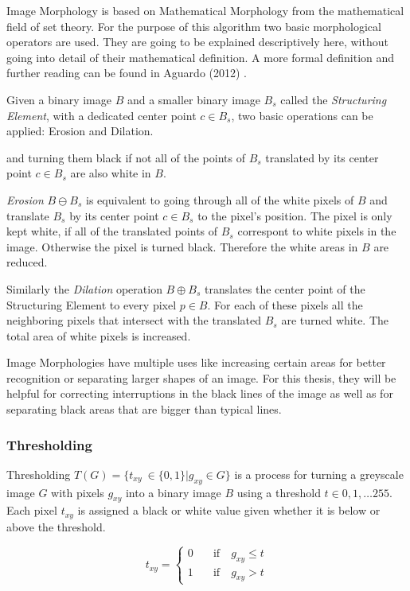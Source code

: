 \documentclass[serif,article,noparskip]{agse-thesis}
\begin{document}
Image Morphology is based on Mathematical Morphology from the mathematical field
of set theory. For the purpose of this algorithm two basic morphological
operators are used. They are going to be explained descriptively here, without
going into detail of their mathematical definition. A more formal definition and
further reading can be found in Aguardo (2012) \cite{Aguardo2012}.

Given a binary image $B$ and a smaller binary image $B_s$ called the
\textit{Structuring Element}, with a dedicated center point $c \in B_s$, two
basic operations can be applied: Erosion and Dilation.

and turning them black if not all of the points of $B_s$
translated by its center point $c \in B_s$ are also white in $B$.

\textit{Erosion} $B \ominus B_s$ is equivalent to going through all of the white
pixels of $B$ and translate $B_s$ by its center point $c \in B_s$ to the pixel's
position. The pixel is only kept white, if all of the translated points of $B_s$
correspont to white pixels in the image. Otherwise the pixel is turned black. Therefore
the white areas in $B$ are reduced. \cite{Smith1997}

Similarly the \textit{Dilation} operation  $B \oplus B_s$ translates the center
point of the Structuring Element to every pixel $p \in B$. For each of these
pixels all the neighboring pixels that intersect with the translated $B_s$ are
turned white. The total area of white pixels is increased. \cite{Smith1997}

Image Morphologies have multiple uses like increasing certain areas for better
recognition or separating larger shapes of an image. For this thesis, they will
be helpful for correcting interruptions in the black lines of the image as well
as for separating black areas that are bigger than typical lines.

\subsubsection{Thresholding}

Thresholding $T(G) = \{t_{xy}\ \in \{0,1\} | g_{xy} \in G\}$ is a process for turning a greyscale image $G$
with pixels $g_{xy}$ into a binary image $B$ using a threshold $t \in
0,1,\dots255$. Each pixel $t_{xy}$ is assigned a black or white value given
whether it is below or above the threshold.

\begin{equation}
  t_{xy} =
  \begin{cases}
    0 & \quad  \text{if}  \quad g_{xy} \leq t\\
    1  & \quad \text{if}  \quad g_{xy} > t
  \end{cases}
\end{equation}
\end{document}

